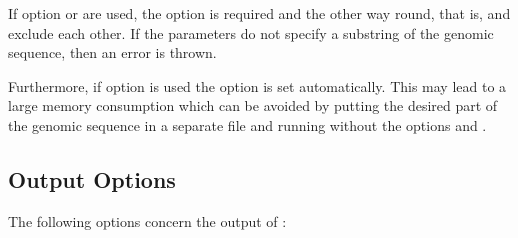 \documentclass[11pt,a4paper,titlepage]{article}
\begin{document}
If option  or  are used, the option
 is required and the other way round, that is, 
and  exclude each other. If the parameters do not specify a
substring of the genomic sequence, then an error is thrown.

Furthermore, if option  is used the option
 is set automatically. This may lead to a large memory
consumption which can be avoided by putting the desired part of the genomic
sequence in a separate file and running \Callgth without the options
 and . 

\subsection{Output Options}
The following options concern the output of \Gth:
\end{document}
